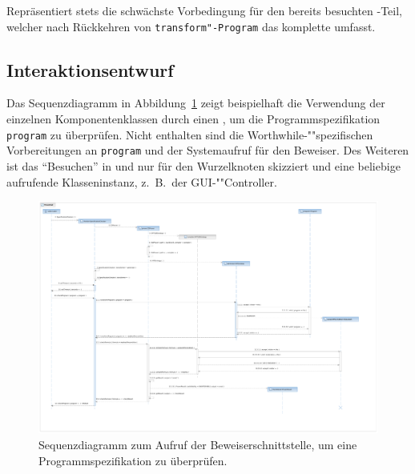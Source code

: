 \begin{description}%

    Repräsentiert stets die schwächste Vorbedingung für den bereits
    besuchten -Teil, welcher nach Rückkehren von
    \texttt{transform"-Program} das komplette  umfasst.%

\end{description}%

\subsection{Interaktionsentwurf}%

Das Sequenzdiagramm in Abbildung~\ref{programchecking_sequencediagram}
zeigt beispielhaft die Verwendung der einzelnen Komponentenklassen
durch einen , um die
Programmspezifikation \texttt{program} zu überprüfen. Nicht enthalten
sind die Worthwhile-""spezifischen Vorbereitungen an \texttt{program}
und der Systemaufruf für den Beweiser. Des Weiteren ist das
"`Besuchen"' in  und  nur für
den Wurzelknoten skizziert und  eine beliebige aufrufende
Klasseninstanz, z.~B.\ der GUI-""Controller.%

\begin{landscape}%
    \begin{figure}[p]%
        \vspace{-2cm}%
        \hspace{-2mm}%
        \includegraphics[height=1.2\textheight]{diagrams/programchecking_sequence.pdf}%

        \caption{Sequenzdiagramm zum Aufruf der Beweiserschnittstelle,
        um eine Programmspezifikation zu überprüfen.}%

        \label{programchecking_sequencediagram}%
    \end{figure}%
\end{landscape}%
